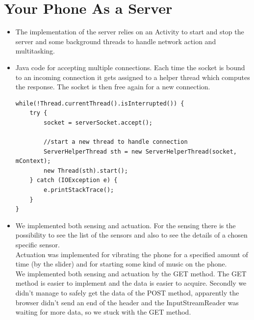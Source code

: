 \documentclass{report}
\begin{document}
\section{Your Phone As a Server}
\begin{itemize}
	\item The implementation of the server relies on an Activity to start and stop the server and some background threads to handle network action and multitasking. 
	\item Java code for accepting multiple connections. Each time the socket is bound to an incoming connection it gets assigned to a helper thread which computes the response. The socket is then free again for a new connection.
		\begin{lstlisting}
while(!Thread.currentThread().isInterrupted()) {
	try {
		socket = serverSocket.accept();	
							
		//start a new thread to handle connection
		ServerHelperThread sth = new ServerHelperThread(socket, mContext);
		new Thread(sth).start();
	} catch (IOException e) {
		e.printStackTrace();
	}
}	
		\end{lstlisting}
	\item We implemented both sensing and actuation. For the sensing there is the possibility to see the list of the sensors and also to see the details of a chosen specific sensor. \\
	Actuation was implemented for vibrating the phone for a specified amount of time (by the slider) and for starting some kind of music on the phone. \\
	We implemented both sensing and actuation by the GET method. The GET method is easier to implement and the data is easier to acquire. Secondly we didn't manage to safely get the data of the POST method, apparently the browser didn't send an end of the header and the InputStreamReader was waiting for more data, so we stuck with the GET method.
\end{itemize}
\end{document}
